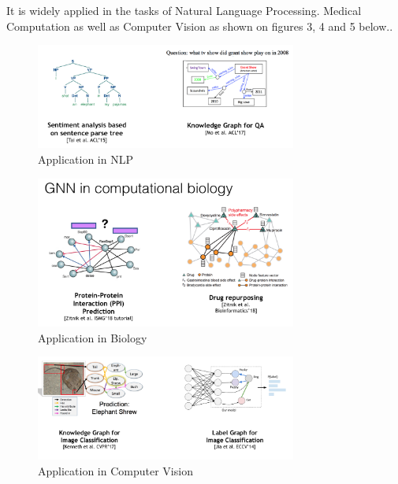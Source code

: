 It is widely applied in the tasks of Natural Language Processing. Medical Computation as well as Computer Vision as shown on figures 3, 4 and 5 below.. 
\begin{figure}[ht]
\begin{center}
  \includegraphics[width=3.38in]{images/NLP.png}
\end{center}
   \caption{Application in NLP}
\label{fig:CV}
\end{figure}

\begin{figure}[ht]
\begin{center}
  \includegraphics[width=3.38in]{images/Biology.png}
\end{center}
   \caption{Application in Biology}
\label{fig:CV}
\end{figure}

\begin{figure}[ht]
\begin{center}
  \includegraphics[width=3.38in]{images/Computer_Vision.png}
\end{center}
   \caption{Application in Computer Vision}
\label{fig:CV}
\end{figure}



